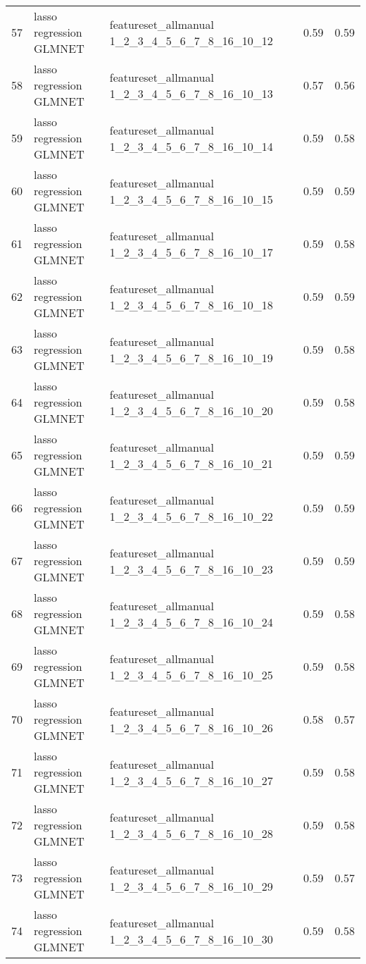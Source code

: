\begin{tabular}{cllcc}
  57 & lasso regression GLMNET & featureset\_allmanual 1\_2\_3\_4\_5\_6\_7\_8\_16\_10\_12 & 0.59 & 0.59 \\ 
  58 & lasso regression GLMNET & featureset\_allmanual 1\_2\_3\_4\_5\_6\_7\_8\_16\_10\_13 & 0.57 & 0.56 \\ 
  59 & lasso regression GLMNET & featureset\_allmanual 1\_2\_3\_4\_5\_6\_7\_8\_16\_10\_14 & 0.59 & 0.58 \\ 
  60 & lasso regression GLMNET & featureset\_allmanual 1\_2\_3\_4\_5\_6\_7\_8\_16\_10\_15 & 0.59 & 0.59 \\ 
  61 & lasso regression GLMNET & featureset\_allmanual 1\_2\_3\_4\_5\_6\_7\_8\_16\_10\_17 & 0.59 & 0.58 \\ 
  62 & lasso regression GLMNET & featureset\_allmanual 1\_2\_3\_4\_5\_6\_7\_8\_16\_10\_18 & 0.59 & 0.59 \\ 
  63 & lasso regression GLMNET & featureset\_allmanual 1\_2\_3\_4\_5\_6\_7\_8\_16\_10\_19 & 0.59 & 0.58 \\ 
  64 & lasso regression GLMNET & featureset\_allmanual 1\_2\_3\_4\_5\_6\_7\_8\_16\_10\_20 & 0.59 & 0.58 \\ 
  65 & lasso regression GLMNET & featureset\_allmanual 1\_2\_3\_4\_5\_6\_7\_8\_16\_10\_21 & 0.59 & 0.59 \\ 
  66 & lasso regression GLMNET & featureset\_allmanual 1\_2\_3\_4\_5\_6\_7\_8\_16\_10\_22 & 0.59 & 0.59 \\ 
  67 & lasso regression GLMNET & featureset\_allmanual 1\_2\_3\_4\_5\_6\_7\_8\_16\_10\_23 & 0.59 & 0.59 \\ 
  68 & lasso regression GLMNET & featureset\_allmanual 1\_2\_3\_4\_5\_6\_7\_8\_16\_10\_24 & 0.59 & 0.58 \\ 
  69 & lasso regression GLMNET & featureset\_allmanual 1\_2\_3\_4\_5\_6\_7\_8\_16\_10\_25 & 0.59 & 0.58 \\ 
  70 & lasso regression GLMNET & featureset\_allmanual 1\_2\_3\_4\_5\_6\_7\_8\_16\_10\_26 & 0.58 & 0.57 \\ 
  71 & lasso regression GLMNET & featureset\_allmanual 1\_2\_3\_4\_5\_6\_7\_8\_16\_10\_27 & 0.59 & 0.58 \\ 
  72 & lasso regression GLMNET & featureset\_allmanual 1\_2\_3\_4\_5\_6\_7\_8\_16\_10\_28 & 0.59 & 0.58 \\ 
  73 & lasso regression GLMNET & featureset\_allmanual 1\_2\_3\_4\_5\_6\_7\_8\_16\_10\_29 & 0.59 & 0.57 \\ 
  74 & lasso regression GLMNET & featureset\_allmanual 1\_2\_3\_4\_5\_6\_7\_8\_16\_10\_30 & 0.59 & 0.58 \\ 

\end{tabular}
